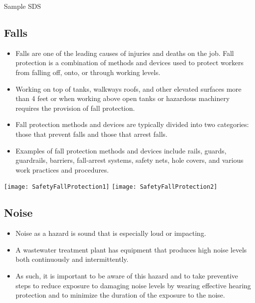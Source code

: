 
\newpage
\hspace{0pt}
\vfill
\begin{center}
Sample SDS
\end{center}
\vfill
\hspace{0pt}
\pagebreak
\hspace{0pt}
\vfill
\begin{center}
\end{center}
\vfill
\hspace{0pt}
\pagebreak


\subsection{Falls}
\begin{itemize}
\item Falls are one of the leading causes of injuries and deaths on the job.  Fall protection is a combination of methods and devices used to protect workers from falling off, onto, or through working levels.
\item Working on top of tanks, walkways roofs, and other elevated surfaces more than 4 feet or when working above open tanks or hazardous machinery requires the provision of fall protection.
\item Fall protection methods and devices are typically divided into two categories: those that prevent falls and those that arrest falls. 
\item Examples of fall protection methods and devices include rails, guards, guardrails, barriers, fall-arrest systems, safety nets, hole covers, and various work practices and procedures.
\end{itemize}
\begin{center}
\texttt{[image: SafetyFallProtection1]}\hspace{1cm} \texttt{[image: SafetyFallProtection2]}\\
\end{center}
\subsection{Noise}
\begin{itemize}
\item Noise as a hazard is sound that is especially loud or impacting. 
\item A wastewater treatment plant has equipment that produces high noise levels both continuously and intermittently. 
\item As such, it is important to be aware of this hazard and to take preventive steps to reduce exposure to damaging noise levels by wearing effective hearing protection and to minimize the duration of the exposure to the noise.
\end{itemize}

